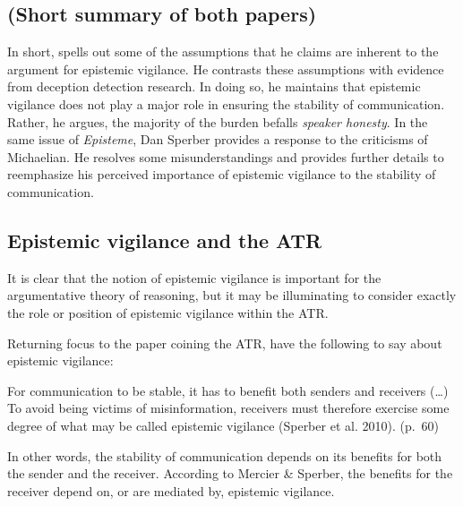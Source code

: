 \subsection*{(Short summary of both papers)}

In short, \citet{Michaelian13} spells out some of the assumptions that he claims are inherent to the argument for epistemic vigilance. He contrasts these assumptions with evidence from deception detection research. In doing so, he maintains that epistemic vigilance does not play a major role in ensuring the stability of communication. Rather, he argues, the majority of the burden befalls \emph{speaker honesty}. In the same \citeyear{Sperber13} issue of \emph{Episteme}, Dan Sperber provides a response to the criticisms of Michaelian. He resolves some misunderstandings and provides further details to reemphasize his perceived importance of epistemic vigilance to the stability of communication.

\subsection{Epistemic vigilance and the ATR}
\label{sec:epi-vigil-atr}


It is clear that the notion of epistemic vigilance is important for the argumentative theory of reasoning, but it may be illuminating to consider exactly the role or position of epistemic vigilance within the ATR.

Returning focus to the paper coining the ATR, \citet{MS11} have the following to say about epistemic vigilance:

\begin{quoting}
    For communication to be stable, it has to benefit both senders and receivers (\ldots) To avoid being victims of misinformation, receivers must therefore exercise some degree of what may be called epistemic vigilance (Sperber et al. 2010).
\hfill (p.~60)
\end{quoting}
In other words, the stability of communication depends on its benefits for both the sender and the receiver. According to Mercier \& Sperber, the benefits for the receiver depend on, or are mediated by, epistemic vigilance.

